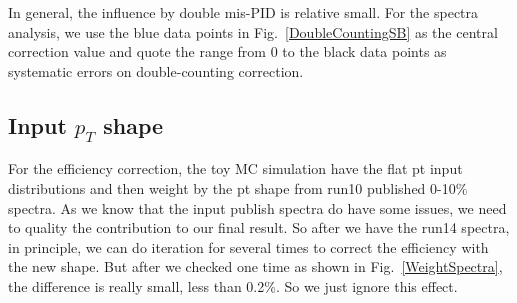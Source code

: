 

In general, the influence by double mis-PID is relative small. For the spectra analysis, we use the blue data points in Fig.~\ref{DoubleCountingSB} as the central correction value and quote the range from 0 to the black data points as systematic errors on double-counting correction.

\subsection{Input $p_T$ shape} 
For the efficiency correction, the toy MC simulation have the flat pt input distributions and then weight by the pt shape from run10 published 0-10\% spectra. As we know that the input publish spectra do have some issues, we need to quality the contribution to our final result. So after we have the run14 spectra, in principle, we can do iteration for several times to correct the efficiency with the new shape. But after we checked one time as shown in Fig.~\ref{WeightSpectra}, the difference is really small, less than 0.2\%. So we just ignore this effect.

